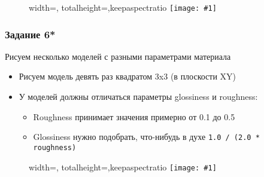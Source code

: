 \documentclass{beamer}
\newcommand{\slideimage}[1]{
  \begin{figure}
    \begin{adjustbox}{width=\textwidth, totalheight=\textheight-2\baselineskip-2\baselineskip,keepaspectratio}
      \texttt{[image: \#1]}
    \end{adjustbox}
  \end{figure}
}
\begin{document}
\begin{frame}[fragile]
\slideimage{5.png}
\end{frame}

\begin{frame}[fragile]
\frametitle{Задание 6*}
Рисуем несколько моделей с разными параметрами материала
\begin{itemize}
\item Рисуем модель девять раз квадратом 3x3 (в плоскости XY)
\item У моделей должны отличаться параметры glossiness и roughness:
\begin{itemize}
\item Roughness принимает значения примерно от 0.1 до 0.5
\item Glossiness нужно подобрать, что-нибудь в духе \verb|1.0 / (2.0 * roughness)|
\end{itemize}
\end{itemize}
\end{frame}

\begin{frame}[fragile]
\slideimage{6.png}
\end{frame}
\end{document}
